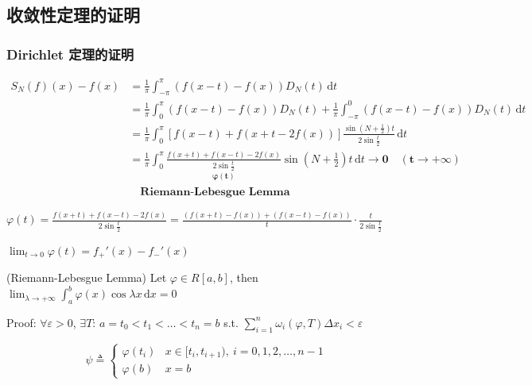 \subsection{收敛性定理的证明}
\subsubsection{Dirichlet 定理的证明}

\begin{align*}
    S_N(f)(x)-f(x)
     & =\frac{1}{\pi}\int_{-\pi}^{\pi}\left(f(x-t)-f(x)\right)D_N(t)\,\mathrm{d}t                                                                                                                 \\
     & =\frac{1}{\pi}\int_0^{\pi}\left(f(x-t)-f(x)\right)D_N(t)+\frac{1}{\pi}\int_{-\pi}^0\left(f(x-t)-f(x)\right)D_N(t)\,\mathrm{d}t                                                             \\
     & =\frac{1}{\pi}\int_0^{\pi}\left[f(x-t)+f(x+t-2f(x))\right]\frac{\sin\left(N+\frac{1}{2}\right)t}{2\sin\frac{t}{2}}\,\mathrm{d}t                                                            \\
     & =\frac{1}{\pi}\int_0^{\pi}\underset{\boldsymbol{\varphi(t)}}{\frac{f(x+t)+f(x-t)-2f(x)}{2\sin\frac{t}{2}}}\sin\left(N+\frac{1}{2}\right)t\,\mathrm{d}t\boldsymbol{\to 0\quad(t\to+\infty)} \\
     & \quad \textbf{Riemann-Lebesgue Lemma}
\end{align*}


$\varphi(t)=\frac{f(x+t)+f(x-t)-2f(x)}{2\sin\frac{t}{2}}=\frac{\left(f(x+t)-f(x)\right)+\left(f(x-t)-f(x)\right)}{t}\cdot\frac{t}{2\sin\frac{t}{2}}$

$\lim_{t\to 0}\varphi(t)=f_+'(x)-f_-'(x)$

(Riemann-Lebesgue Lemma) Let $\varphi\in R[a,b]$, then $\lim_{\lambda\to+\infty}\int_a^b\varphi(x)\cos \lambda x\,\mathrm{d}x=0$

Proof: $\forall\varepsilon>0$, $\exists T:\,a=t_0<t_1<\dots<t_n=b$ s.t. $\sum_{i=1}^n\omega_i(\varphi,T)\Delta x_i<\varepsilon$

$$\psi\triangleq\begin{cases}
        \varphi(t_i) & x\in[t_i,t_{i+1}),\ i=0,1,2,\dots,n-1 \\
        \varphi(b)   & x=b
    \end{cases}$$

